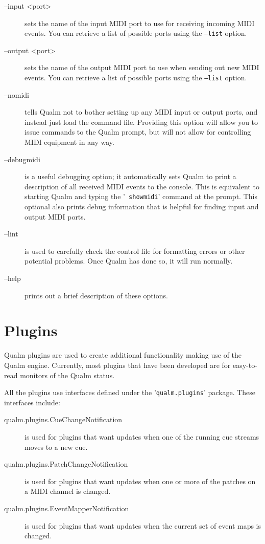 \documentclass{article}
\newcommand{\q}{{\textsf{Qualm}}\xspace}
\begin{document}
\begin{description}
\item[--input <port>] sets the name of the input MIDI port to
  use for receiving incoming MIDI events.  You can retrieve a list of
  possible ports using the {\tt --list} option.

\item[--output <port>] sets the name of the output MIDI port to
  use when sending out new MIDI events.  You can retrieve a list of
  possible ports using the {\tt --list} option.

\item[--nomidi] tells \q not to bother setting up any MIDI input or
  output ports, and instead just load the command file.  Providing
  this option will allow you to issue commands to the \q prompt, but
  will not allow for controlling MIDI equipment in any way.

\item[--debugmidi] is a useful debugging option; it automatically sets
  \q to print a description of all received MIDI events to the
  console.  This is equivalent to starting \q and typing the '{\tt
    showmidi}' command at the prompt.  This optional also prints debug
  information that is helpful for finding input and output MIDI ports.

\item[--lint] is used to carefully check the control file for
  formatting errors or other potential problems.  Once \q has done so,
  it will run normally.

\item[--help] prints out a brief description of these options.

\end{description}

\begin{latexonly}
\newpage
\end{latexonly}
\section{Plugins}
\label{sec:plugins}

\q plugins are used to create additional functionality making use of
the \q engine.  Currently, most plugins that have been developed are
for easy-to-read monitors of the \q status.

All the plugins use interfaces defined under the '{\tt qualm.plugins}'
package.  These interfaces include:

\begin{description}
\item[qualm.plugins.CueChangeNotification] is used for plugins that
  want updates when one of the running cue streams moves to a new cue.

\item[qualm.plugins.PatchChangeNotification] is used for plugins that
  want updates when one or more of the patches on a MIDI channel is
  changed.

\item[qualm.plugins.EventMapperNotification] is used for plugins that
  want updates when the current set of event maps is changed.
\end{description}
\end{document}
